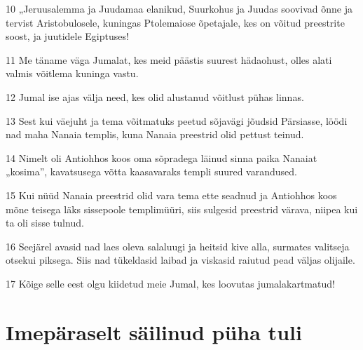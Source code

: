 \par 10 „Jeruusalemma ja Juudamaa elanikud, Suurkohus ja Juudas soovivad õnne ja tervist Aristobulosele, kuningas Ptolemaiose õpetajale, kes on võitud preestrite soost, ja juutidele Egiptuses!
\par 11 Me täname väga Jumalat, kes meid päästis suurest hädaohust, olles alati valmis võitlema kuninga vastu.
\par 12 Jumal ise ajas välja need, kes olid alustanud võitlust pühas linnas.
\par 13 Sest kui väejuht ja tema võitmatuks peetud sõjavägi jõudsid Pärsiasse, löödi nad maha Nanaia templis, kuna Nanaia preestrid olid pettust teinud.
\par 14 Nimelt oli Antiohhos koos oma sõpradega läinud sinna paika Nanaiat „kosima”, kavatsusega võtta kaasavaraks templi suured varandused.
\par 15 Kui nüüd Nanaia preestrid olid vara tema ette seadnud ja Antiohhos koos mõne teisega läks sissepoole templimüüri, siis sulgesid preestrid värava, niipea kui ta oli sisse tulnud.
\par 16 Seejärel avasid nad laes oleva salaluugi ja heitsid kive alla, surmates valitseja otsekui piksega. Siis nad tükeldasid laibad ja viskasid raiutud pead väljas olijaile.
\par 17 Kõige selle eest olgu kiidetud meie Jumal, kes loovutas jumalakartmatud!


\section*{Imepäraselt säilinud püha tuli}

